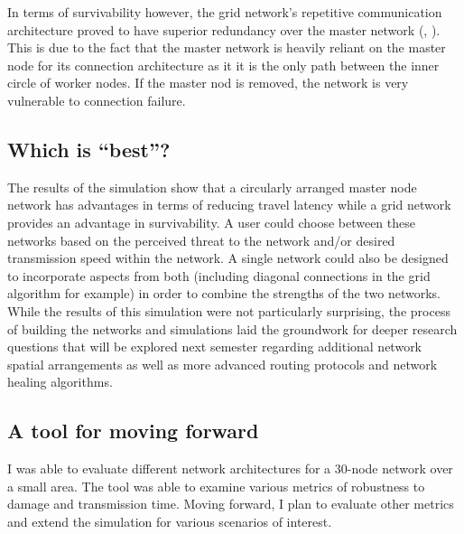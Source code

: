 \documentclass[twocolumn,10pt]{IEEEtran}
\begin{document}
In terms of survivability however, the grid network’s repetitive communication architecture proved to have superior redundancy over the master network (, ). This is due to the fact that the master network is heavily reliant on the master node for its connection architecture as it it is the only path between the inner circle of worker nodes. If the master nod is removed, the network is very vulnerable to connection failure.  

\subsection{Which is ``best''?}
The results of the simulation show that a circularly arranged master node network has advantages in terms of reducing travel latency while a grid network provides an advantage in survivability. A user could choose between these networks based on the perceived threat to the network and/or desired transmission speed within the network. A single network could also be designed to incorporate aspects from both  (including diagonal connections in the grid algorithm for example) in order to combine the strengths of the two networks. While the results of this simulation were not particularly surprising, the process of building the networks and simulations laid the groundwork for deeper research questions that will be explored next semester regarding additional network spatial arrangements as well as more advanced routing protocols and network healing algorithms.

\subsection{A tool for moving forward}
I was able to evaluate different network architectures for a 30-node network over a small area. The tool was able to examine various metrics of robustness to damage and transmission time. Moving forward, I plan to evaluate other metrics and extend the simulation for various scenarios of interest. 

\end{document}
